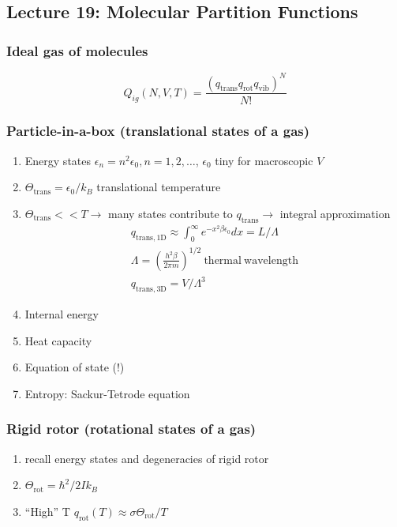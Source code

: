 \documentclass[11pt]{article}
\begin{document}
\subsection{Lecture 19: Molecular Partition Functions}
\label{sec:org768d35d}
\subsubsection{Ideal gas of molecules}
\label{sec:orga2493e0}
\begin{displaymath}
  Q_{ig}(N,V,T) = \frac{(q_\mathrm{trans}q_\mathrm{rot}q_\mathrm{vib})^N}{N!}
\end{displaymath}

\subsubsection{Particle-in-a-box (translational states of a gas)}
\label{sec:org1c049c3}
\begin{enumerate}
\item Energy states \(\epsilon_n=n^2\epsilon_0, n=1,2, \ldots\), \(\epsilon_0\) tiny for macroscopic \(V\)
\item \(\Theta_\mathrm{trans} = \epsilon_0/k_B\) translational temperature
\item \(\Theta_\mathrm{trans} << T \rightarrow\) many states contribute to \(q_\mathrm{trans}\rightarrow\) integral approximation
\begin{eqnarray*}
  q_\mathrm{trans,1D} \approx \int_0^\infty e^{-x^2\beta\epsilon_0}dx =
  L/\Lambda \\
  \Lambda = \left ( \frac{h^2\beta}{2\pi m} \right )^{1/2}\
  \mathrm{thermal\ wavelength} \\
  q_\mathrm{trans,3D} = V/\Lambda^3
\end{eqnarray*}
\item Internal energy
\item Heat capacity
\item Equation of state (!)
\item Entropy: Sackur-Tetrode equation
\end{enumerate}

\subsubsection{Rigid rotor (rotational states of a gas)}
\label{sec:org3fc1e80}
\begin{enumerate}
\item recall energy states and degeneracies of rigid rotor
\item \(\Theta_\mathrm{rot} = \hbar^2/2 I k_B\)
\item ``High'' T \(q_\mathrm{rot}(T) \approx \sigma \Theta_\mathrm{rot}/T\)
\end{enumerate}
\end{document}

